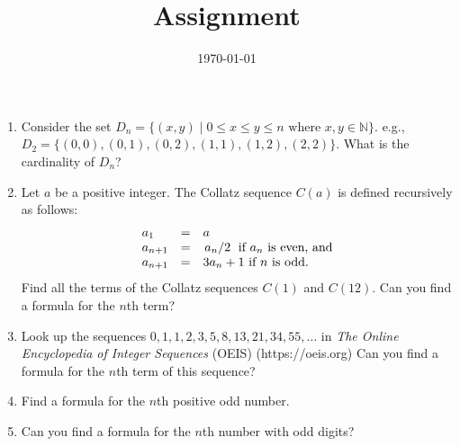 \documentclass[12pt]{amsart}
\title{Assignment}
\date{\today}
\begin{document}
\maketitle
\begin{enumerate}
\item Consider the set $D_n = \{(x,y) \mid 0 \leq x \leq y \leq n \text{ where } x, y \in \mathbb{N}\}$. e.g., $D_2 =  \{ (0,0), (0,1), (0,2), (1,1), (1,2), (2,2)\}$. What is the cardinality of $D_n$?
\item Let $a$ be a positive integer. The Collatz sequence $C(a)$ is defined recursively as follows:
\begin{equation*}
  \begin{array}{lcl}
    a_1 &=& a \\
    a_{n+1}&=&\flatfrac{a_n}{2} \text { if } a_n \text{ is even, and}\\
    a_{n+1}&=&3a_n+1 \text{ if } n \text{ is odd.}
  \end{array}
\end{equation*}
Find all the terms of the Collatz sequences $C(1)$ and $C(12)$. Can you find a formula for the $n$th term?

\item Look up the sequences $0, 1, 1, 2, 3, 5, 8, 13, 21, 34, 55,\ldots$ in \textit{The Online Encyclopedia of Integer Sequences}
(OEIS) (https://oeis.org) Can you find a formula for the $n$th term of this sequence?
\item Find a formula for the $n$th positive odd number.
\item Can you find a formula for the $n$th number with odd digits?
\end{enumerate}
\end{document}
